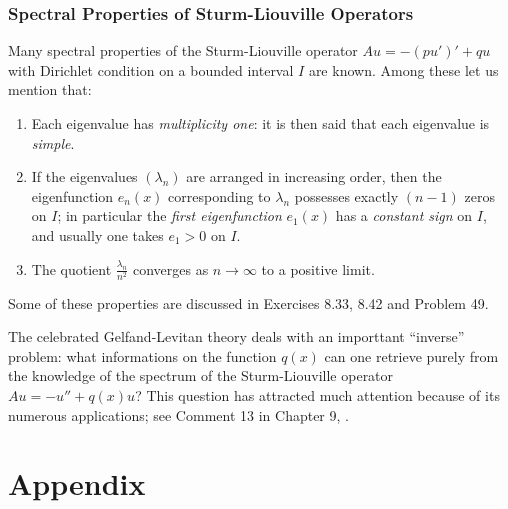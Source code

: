 \documentclass[a4paper,oneside]{book}
\numberwithin{equation}{chapter}
\begin{document}
\subsection{Spectral Properties of Sturm-Liouville Operators}
Many spectral properties of the Sturm-Liouville operator $Au=-\left(pu'\right)'+qu$ with Dirichlet condition on a bounded interval $I$ are known. Among these let us mention that:
\begin{enumerate}
\item Each eigenvalue has \textit{multiplicity one}: it is then said that each eigenvalue is \textit{simple}.
\item If the eigenvalues $\left(\lambda _n\right)$ are arranged in increasing order, then the eigenfunction $e_n\left(x\right)$ corresponding to $\lambda _n$ possesses exactly $\left(n-1\right)$ zeros on $I$; in particular the \textit{first eigenfunction} $e_1\left(x\right)$ has a \textit{constant sign} on $I$, and usually one takes $e_1>0$ on $I$.
\item The quotient $\frac{\lambda _n}{n^2}$ converges as $n\to \infty$ to a positive limit.
\end{enumerate}

Some of these properties are discussed in Exercises 8.33, 8.42 and Problem 49. 

The celebrated Gelfand-Levitan theory deals with an importtant ``inverse'' problem: what informations on the function $q\left(x\right)$ can one retrieve purely from the knowledge of the spectrum of the Sturm-Liouville operator $Au=-u''+q\left(x\right)u$? This question has attracted much attention because of its numerous applications; see Comment 13 in Chapter 9, \cite{1}. 








































\appendix
\chapter{Appendix}
\end{document}
